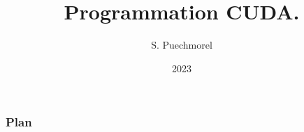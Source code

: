 \documentclass{beamer}
\title{Programmation CUDA.}
\author{S. Puechmorel}
\date{2023}
\begin{document}
\begin{frame}
    \titlepage

\end{frame}
\begin{frame}
  \frametitle{Plan}
\tableofcontents
\end{frame}


\end{document}
